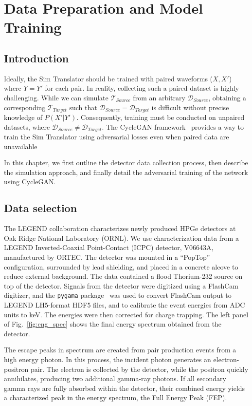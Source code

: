 \chapter{Data Preparation and Model Training}\label{chap:training}

\section{Introduction}
Ideally, the Sim Translator should be trained with paired waveforms ($X, X'$) where $Y=Y'$ for each pair. In reality, collecting such a paired dataset is highly challenging. While we can simulate $\mathcal{T}_{Source}$ from an arbitrary $\mathcal{D}_{Source}$, obtaining a corresponding $\mathcal{T}_{Target}$ such that $\mathcal{D}_{Source} = \mathcal{D}_{Target}$ is difficult without precise knowledge of $P(X'|Y')$. Consequently, training must be conducted on unpaired datasets, where $\mathcal{D}_{Source} \neq \mathcal{D}_{Target}$. The CycleGAN framework~\cite{CycleGAN} provides a way to train the Sim Translator using adversarial losses even when paired data are unavailable

In this chapter, we first outline the detector data collection process, then describe the simulation approach, and finally detail the adversarial training of the network using CycleGAN.

\section{Data selection}

The LEGEND collaboration characterizes newly produced HPGe detectors at Oak Ridge National Laboratory (ORNL). We use characterization data from a LEGEND Inverted-Coaxial Point-Contact (ICPC) detector, V06643A, manufactured by ORTEC. The detector was mounted in a “PopTop” configuration, surrounded by lead shielding, and placed in a concrete alcove to reduce external background. The data contained a flood Thorium-232 source on top of the detector. Signals from the detector were digitized using a FlashCam digitizer, and the \texttt{pygama} package~\cite{pygama} was used to convert FlashCam output to LEGEND LH5-format HDF5 files, and to calibrate the event energies from ADC units to keV. The energies were then corrected for charge trapping. The left panel of Fig.~\ref{fig:eng_spec} shows the final energy spectrum obtained from the detector.


The escape peaks in spectrum are created from pair production events from a high energy photon. In this process, the incident photon generates an electron-positron pair. The electron is collected by the detector, while the positron quickly annihilates, producing two additional gamma-ray photons. If all secondary gamma rays are fully absorbed within the detector, their combined energy yields a characterized peak in the energy spectrum, the Full Energy Peak (FEP).



